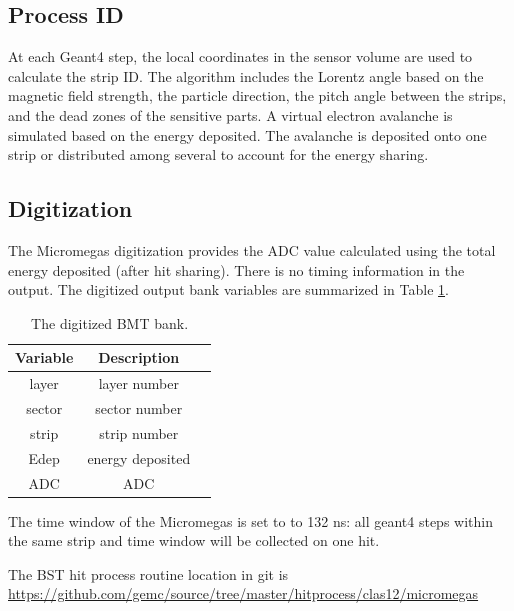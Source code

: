 \subsection{Process ID}
At each Geant4 step, the local coordinates in the sensor volume are used to calculate the strip ID.
The algorithm includes the Lorentz angle based on the magnetic field strength, the particle direction,
the pitch angle between the strips, and the dead zones of the sensitive parts.
A virtual electron avalanche is simulated based on the energy deposited. The avalanche
is deposited onto one strip or distributed among several to account for the energy sharing.



\subsection{Digitization}

The Micromegas digitization provides the ADC value calculated using the total energy deposited (after hit sharing).
There is no timing information in the output.
The digitized output bank variables are summarized in Table \ref{tab:mmBank}.

\begin{table}[h]
	\begin{center}
		\begin{tabular}{| c | c | c |}
			\hline \hline
			Variable & Description  \\
			\hline
              layer  &      layer number   \\
             sector  &     sector number   \\
              strip  &      strip number   \\
               Edep  &  energy deposited   \\
                ADC  &               ADC   \\
			\hline \hline
		\end{tabular}
	\end{center}
	\caption{The digitized BMT bank.}\label{tab:mmBank}
\end{table}

The time window  of the Micromegas is set to to 132 ns: all geant4 steps within the same strip and time window will be collected on one hit.

The BST hit process routine location in git is \url{https://github.com/gemc/source/tree/master/hitprocess/clas12/micromegas}

